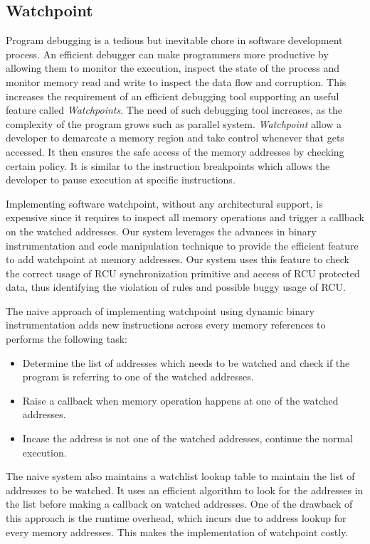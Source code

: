 \subsection{Watchpoint}
Program debugging is a tedious but inevitable chore in software development process. An efficient debugger can make programmers more productive by allowing them to monitor the execution, inspect the state of the process and monitor memory read and write to inspect the data flow and corruption. This increases the requirement of an efficient debugging tool supporting an useful feature called \emph{Watchpoints}. The need of such debugging tool increases, as the complexity of the program grows such as parallel system. \emph{Watchpoint} allow a developer to demarcate a memory region and take control whenever that gets accessed. It then ensures the safe access of the memory addresses by checking certain policy. It is similar to the instruction breakpoints which allows the developer to pause execution at specific instructions.

Implementing software watchpoint, without any architectural support, is expensive since it requires to inspect all memory operations and trigger a callback on the watched addresses. Our system leverages the advances in binary instrumentation and code manipulation technique to provide the efficient feature to add watchpoint at memory addresses. Our system uses this feature to check the correct usage of RCU synchronization primitive and access of RCU protected data, thus identifying the violation of rules and possible buggy usage of RCU.

The naive approach of implementing watchpoint using dynamic binary instrumentation adds new instructions across every memory references to performs the following task: 
\begin{itemize}
	\item Determine the list of addresses which needs to be watched and check if the program is referring to one of the watched addresses.  
	\item Raise a callback when memory operation happens at one of the watched addresses.
	\item Incase the address is not one of the watched addresses, continue the normal execution.
\end{itemize}  
The naive system also maintains a watchlist lookup table to maintain the list of addresses to be watched. It uses an efficient algorithm to look for the addresses in the list before making a callback on watched addresses. One of the drawback of this approach is the runtime overhead, which incurs due to address lookup for every memory addresses. This makes the implementation of watchpoint costly. 

